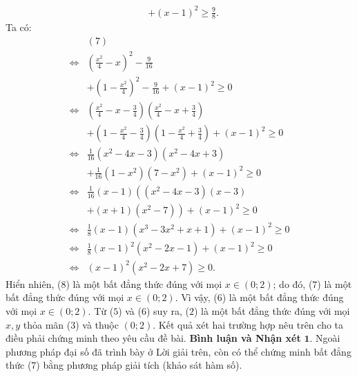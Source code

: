 \begin{multicols}{2}
\begin{align*}
		&+ {\left( {x - 1} \right)^2} \ge \frac{9}{8}. \tag{$7$}
	\end{align*}
	Ta có:
	\begin{align*}
			&(7)\\
			 \Leftrightarrow& {\left( {\frac{{{x^2}}}{4} - x} \right)^2} - \frac{9}{{16}} \\
			 &+ {\left( {1 - \frac{{{x^2}}}{4}} \right)^2} - \frac{9}{{16}} + {\left( {x - 1} \right)^2} \ge 0\\
			 \Leftrightarrow& \left( {\frac{{{x^2}}}{4} - x - \frac{3}{4}} \right)\left( {\frac{{{x^2}}}{4} - x + \frac{3}{4}} \right)\\
			 &+ \!\left(\!\! {1\! -\! \frac{{{x^2}}}{4} \!-\! \frac{3}{4}} \!\!\right)\!\!\!\left(\!\! {1 \!-\! \frac{{{x^2}}}{4} \!+\! \frac{3}{4}} \!\!\right) \!+\! {\left( {x \!-\! 1} \right)^2} \!\ge\! 0\\
			 \Leftrightarrow& \frac{1}{{16}}\left( {{x^2} - 4x - 3} \right)\left( {{x^2} - 4x + 3} \right) \\
			 &+ \frac{1}{{16}}\left( {1 - {x^2}} \right)\left( {7 - {x^2}} \right) + {\left( {x - 1} \right)^2} \ge 0\\
			 \Leftrightarrow& \frac{1}{{16}}\left( {x - 1} \right)\left( \left( {{x^2} - 4x - 3} \right)\left( {x - 3} \right)\right. \\
			 &\left. + \left( {x + 1} \right)\left( {{x^2} - 7} \right) \right) + {\left( {x - 1} \right)^2} \ge 0\\
			 \Leftrightarrow& \frac{1}{8}\left( {x \!-\! 1} \right)\!\left( {{x^3} \!-\! 3{x^2} \!+\! x \!+\! 1} \!\right) \!+\! {\left( {x \!-\! 1} \right)^2} \!\ge\! 0\\
			 \Leftrightarrow& \frac{1}{8}{\left( {x - 1} \right)^2}\left( {{x^2} - 2x - 1} \right) + {\left( {x - 1} \right)^2} \ge 0\\
			 \Leftrightarrow&{\left( {x- 1} \right)^2}\left( {{x^2} - 2x + 7} \right) \ge 0. \tag{$8$}
	\end{align*}
	Hiển nhiên, ($8$) là một bất đẳng thức đúng với mọi $x \in (0;2)$; do đó, ($7$) là một bất đẳng thức đúng với mọi $x \in (0; 2)$. Vì vậy, ($6$) là một bất đẳng thức đúng với mọi $x \in (0; 2)$.
	\vskip 0.05cm
	Từ ($5$) và ($6$) suy ra, ($2$) là một bất đẳng thức đúng với mọi $x, y$ thỏa mãn ($3$) và thuộc $(0; 2)$.
	\vskip 0.05cm
	Kết quả xét hai trường hợp nêu trên cho ta điều phải chứng minh theo yêu cầu đề bài.
	\vskip 0.05cm
	\textbf{\color{thachthuctoanhoc}Bình luận và Nhận xét}
	\vskip 0.05cm
	$\pmb{1.}$ Ngoài phương pháp đại số đã trình bày ở Lời giải trên, còn có thể chứng minh bất đẳng thức ($7$) bằng phương pháp giải tích (khảo sát hàm số).

\end{multicols}
